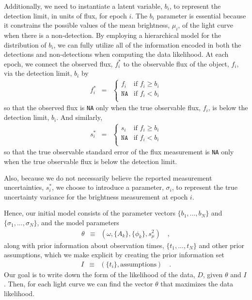 \documentclass[12pt,preprint]{aastex}
\newcommand{\fobs}{f_i^*}
\newcommand{\sobs}{s_i^*}
\begin{document}
Additionally, we need to instantiate a latent variable, $b_i$, to represent the detection limit, in units of flux, for epoch $i$.  The $b_i$ parameter is essential because it constrains the possible values of the mean brightness, $\mu_i$, of the light curve when there is a non-detection.  By employing a hierarchical model for the distribution of $b_i$, we can fully utilize all of the information encoded in both the detections and non-detections when computing the data likelihood.   At each epoch, we connect the observed flux, $\fobs$ to the observable flux of the object, $f_i$, via the detection limit, $b_i$ by
\begin{eqnarray}\displaystyle
\fobs &=& \left\{\begin{array}{ll}
  f_i & \mbox{if $f_i \ge b_i$} \\
  \texttt{NA} & \mbox{if $f_i < b_i$} \\
\end{array} \right.
\end{eqnarray}
so that the observed flux is \texttt{NA} only when the true observable flux, $f_i$, is below the detection limit, $b_i$.  And similarly,
\begin{eqnarray}\displaystyle
\sobs &=& \left\{\begin{array}{ll}
  s_i & \mbox{if $f_i \ge b_i$} \\
  \texttt{NA} & \mbox{if $f_i < b_i$} \\
\end{array} \right.
\end{eqnarray}
so that the true observable standard error of the flux measurement is \texttt{NA} only when the true observable flux is below the detection limit.

Also, because we do not necessarily believe the reported measurement uncertainties, $\sobs$, we choose to introduce a parameter, $\sigma_i$, to represent the true uncertainty variance for the brightness measurement at epoch $i$.

Hence, our initial model consists of the parameter vectors $\{b_1,...,b_N\}$ and $\{\sigma_1,...,\sigma_N\}$, and the model parameters
\begin{eqnarray}\displaystyle
\theta &\equiv& (\omega, \{A_k\}, \{\phi_k\}, s_\mu^2) \quad ,
\end{eqnarray}
along with prior information about observation times, $\{t_1,...,t_N\}$ and other prior assumptions, which we make explicit by creating the prior information set
\begin{eqnarray}\displaystyle
I &\equiv& (\{t_i\}, \mbox{assumptions}) \quad .
\end{eqnarray}
Our goal is to write down the form of the likelihood of the data, $D$, given $\theta$ and $I$.  Then, for each light curve we can find the vector $\theta$ that maximizes the data likelihood.
\end{document}
